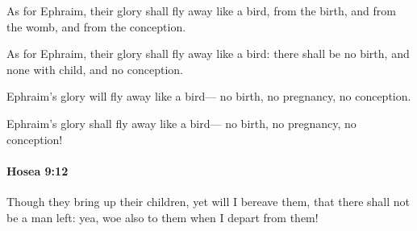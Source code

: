 			As for Ephraim, their glory shall fly away like a bird, from the birth, and from the womb, and from the conception.

			\begin{versebox}
					\item[BHS] 
					\item[LXX] 
					\item[ASV] As for Ephraim, their glory shall fly away like a bird: there shall be no birth, and none with child, and no conception.
					\item[NIV] Ephraim’s glory will fly away like a bird— no birth, no pregnancy, no conception.
					\item[NRSV] Ephraim’s glory shall fly away like a bird— no birth, no pregnancy, no conception!
			\end{versebox}

		\paragraph{Hosea 9:12} %
			\label{HOSEA-9-12}

			Though they bring up their children, yet will I bereave them, that there shall not be a man left: yea, woe also to them when I depart from them!

